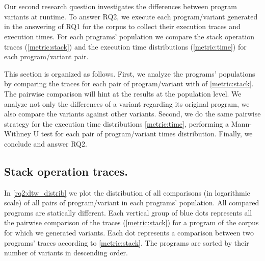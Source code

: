 \section{\rqtwo}



Our second research question investigates the differences between program variants at runtime.
To answer RQ2, we execute each program/variant generated in the answering of RQ1 for the \corpusrosetta corpus to collect their execution traces and execution times.
For each programs' population we compare the stack operation traces (\autoref{metric:stack}) and the execution time distributions (\autoref{metric:time}) for each program/variant pair.

This section is organized as follows. First, we analyze the programs' populations by comparing the traces for each pair of program/variant with \DTW of \autoref{metric:stack}. The pairwise comparison will hint at the results at the population level. We analyze not only the differences of a variant regarding its original program, we also compare the variants against other variants. Second, we do the same pairwise strategy for the execution time distributions \autoref{metric:time}, performing a Mann-Withney U test for each pair of program/variant times distribution. Finally, we conclude and answer RQ2.

\subsection*{Stack operation traces.}


In \autoref{rq2:dtw_distrib} we plot the distribution of all comparisons (in logarithmic scale) of all pairs of program/variant in each programs' population. All compared programs are statically different. Each vertical group of blue dots  represents all the pairwise comparison of the traces (\autoref{metric:stack}) for a program of the \corpusrosetta corpus for which we generated variants.
Each dot represents a comparison between two programs' traces according to \autoref{metric:stack}. 
The programs are sorted by their number of variants in descending order.

